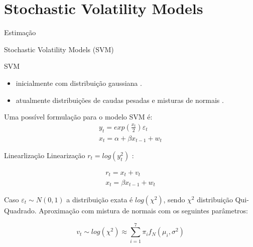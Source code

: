 \documentclass{beamer}
\begin{document}
\section{Stochastic Volatility Models}
\begin{frame}{Estimação}
    \begin{block}{ }
      \Huge  Stochastic Volatility Models (SVM)
    \end{block}
\end{frame}





\begin{frame}{SVM}

\begin{itemize}
\item inicialmente com distribuição gaussiana \citep{HULL1987}.
\item atualmente distribuições de caudas pesadas e misturas de normais \citep{Virbickaite2016}.
\end{itemize}

Uma possível formulação para o modelo SVM é:
\begin{eqnarray}
y_t = exp\left(\frac{x_t}{2}\right)\varepsilon_t \nonumber \\
x_t = \alpha +  \beta x_{t-1} + w_t
\end{eqnarray}


\end{frame}


\begin{frame}{Linearlização}
Linearização  $r_t = log(y_t^2)$  \citep{Kim1998}:


\begin{eqnarray}
r_t = x_t + v_t  \nonumber \\
x_t = \beta x_{t-1} + w_t
\label{eq:svm_basico}
\end{eqnarray}


Caso $\varepsilon_t \sim N(0,1)$ a distribuição exata é $log(\chi^2)$, sendo $\chi^2$ distribuição Qui-Quadrado. Aproximação com mistura de normais com os seguintes parâmetros:

\begin{equation}
v_t \sim log(\chi^2) \approx \sum_{i=1}^7 \pi_i f_N(\mu_i,\sigma^2)
\label{eq:mixnormal}
\end{equation}

\end{frame}
\end{document}
